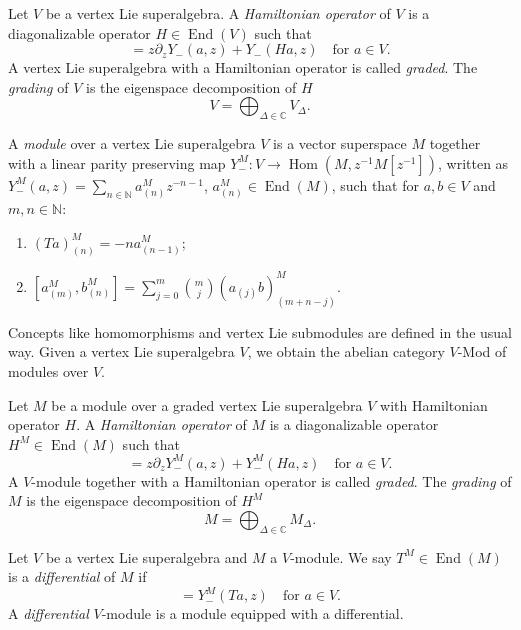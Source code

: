 \documentclass[a4paper, 12pt, reqno]{amsart}
\theoremstyle{remark}
\numberwithin{equation}{subsection}
\DeclareMathOperator{\End}{End}
\DeclareMathOperator{\Hom}{Hom}
\begin{document}
Let $V$ be a vertex Lie superalgebra.
A \emph{Hamiltonian operator} of $V$ is a diagonalizable operator $H \in \End(V)$ such that
\begin{equation*}
  [H, Y_-(a, z)] = z\partial_zY_-(a, z) + Y_-(Ha, z) \quad \text{for }a \in V.
\end{equation*}
A vertex Lie superalgebra with a Hamiltonian operator is called \emph{graded}.
The \emph{grading} of $V$ is the eigenspace decomposition of $H$
\begin{equation*}
  V = \bigoplus_{\Delta \in \mathbb{C}}V_{\Delta}.
\end{equation*}

A \emph{module} over a vertex Lie superalgebra $V$ is a vector superspace $M$ together with a linear parity preserving map $Y^M_-: V \to \Hom(M, z^{-1}M[z^{-1}])$, written as $Y^M_-(a, z) = \sum_{n \in \mathbb{N}}a^M_{(n)}z^{-n - 1}$, $a^M_{(n)} \in \End(M)$, such that for $a, b \in V$ and $m, n \in \mathbb{N}$:
\begin{enumerate}
\item $(Ta)^M_{(n)} = -na^M_{(n - 1)}$;
\item $[a^M_{(m)}, b^M_{(n)}] = \sum_{j = 0}^m\binom{m}{j}(a_{(j)}b)^M_{(m + n - j)}$.
\end{enumerate}
Concepts like homomorphisms and vertex Lie submodules are defined in the usual way.
Given a vertex Lie superalgebra $V$, we obtain the abelian category $V$-Mod of modules over $V$.

Let $M$ be a module over a graded vertex Lie superalgebra $V$ with Hamiltonian operator $H$.
A \emph{Hamiltonian operator} of $M$ is a diagonalizable operator $H^M \in \End(M)$ such that
\begin{equation*}
  [H^M, Y^M_-(a, z)] = z\partial_zY^M_-(a, z) + Y^M_-(Ha, z) \quad \text{for }a \in V.
\end{equation*}
A $V$-module together with a Hamiltonian operator is called \emph{graded}.
The \emph{grading} of $M$ is the eigenspace decomposition of $H^M$
\begin{equation*}
  M = \bigoplus_{\Delta \in \mathbb{C}}M_{\Delta}.
\end{equation*}

Let $V$ be a vertex Lie superalgebra and $M$ a $V$-module.
We say $T^M \in \End(M)$ is a \emph{differential} of $M$ if
\begin{equation*}
  [T^M, Y^M_-(a, z)] = Y^M_-(Ta, z) \quad \text{for }a \in V.
\end{equation*}
A \emph{differential} $V$-module is a module equipped with a differential.
\end{document}
